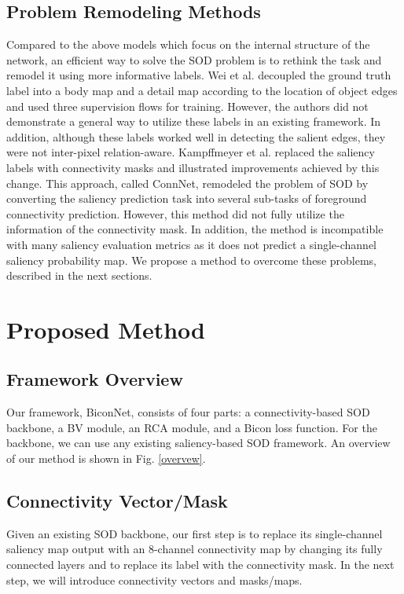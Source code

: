 \documentclass[review]{cvpr}
\begin{document}
\subsection{Problem Remodeling Methods}
Compared to the above models which focus on the internal structure of the network, an efficient way to solve the SOD problem is to rethink the task and remodel it using more informative labels. Wei et al. \cite{LDF} decoupled the ground truth label into a body map and a detail map according to the location of object edges and used three supervision flows for training. However, the authors did not demonstrate a general way to utilize these labels in an existing framework. In addition, although these labels worked well in detecting the salient edges, they were not inter-pixel relation-aware. Kampffmeyer et al. \cite{ConnNet} replaced the saliency labels with connectivity masks and illustrated improvements achieved by this change. This approach, called ConnNet, remodeled the problem of SOD by converting the saliency prediction task into several sub-tasks of foreground connectivity prediction. However, this method did not fully utilize the information of the connectivity mask. In addition, the method is incompatible with many saliency evaluation metrics as it does not predict a single-channel saliency probability map. We propose a method to overcome these problems, described in the next sections.


\section{Proposed Method}
\subsection{Framework Overview}
Our framework, BiconNet, consists of four parts: a connectivity-based SOD backbone, a BV module, an RCA module, and a Bicon loss function. For the backbone, we can use any existing saliency-based SOD framework. An overview of our method is shown in Fig. \ref{overvew}.

\subsection{Connectivity Vector/Mask}
Given an existing SOD backbone, our first step is to replace its single-channel saliency map output with an 8-channel connectivity map by changing its fully connected layers and to replace its label with the connectivity mask. In the next step, we will introduce connectivity vectors and masks/maps. 
\end{document}
